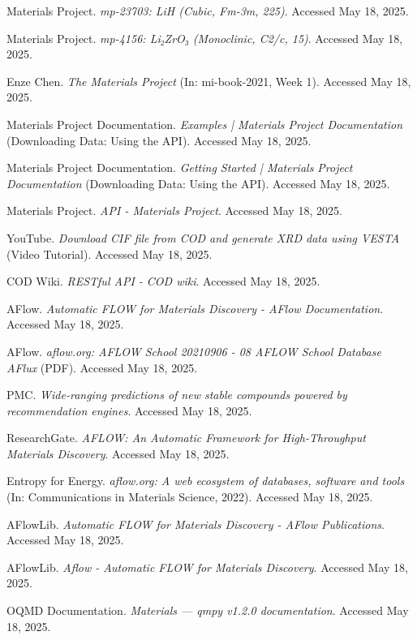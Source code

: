 \documentclass[letterpaper]{article} %
\begin{document}
\begin{thebibliography}{99}
 Materials Project. \textit{mp-23703: LiH (Cubic, Fm-3m, 225)}. Accessed May 18, 2025.

 Materials Project. \textit{mp-4156: Li₂ZrO₃ (Monoclinic, C2/c, 15)}. Accessed May 18, 2025.

 Enze Chen. \textit{The Materials Project} (In: mi-book-2021, Week 1). Accessed May 18, 2025.

 Materials Project Documentation. \textit{Examples | Materials Project Documentation} (Downloading Data: Using the API). Accessed May 18, 2025.

 Materials Project Documentation. \textit{Getting Started | Materials Project Documentation} (Downloading Data: Using the API). Accessed May 18, 2025.

 Materials Project. \textit{API - Materials Project}. Accessed May 18, 2025.

 YouTube. \textit{Download CIF file from COD and generate XRD data using VESTA} (Video Tutorial). Accessed May 18, 2025.

 COD Wiki. \textit{RESTful API - COD wiki}. Accessed May 18, 2025.

 AFlow. \textit{Automatic FLOW for Materials Discovery - AFlow Documentation}. Accessed May 18, 2025.

 AFlow. \textit{aflow.org: AFLOW School 20210906 - 08 AFLOW School Database AFlux} (PDF). Accessed May 18, 2025.

 PMC. \textit{Wide-ranging predictions of new stable compounds powered by recommendation engines}. Accessed May 18, 2025.

 ResearchGate. \textit{AFLOW: An Automatic Framework for High-Throughput Materials Discovery}. Accessed May 18, 2025.

 Entropy for Energy. \textit{aflow.org: A web ecosystem of databases, software and tools} (In: Communications in Materials Science, 2022). Accessed May 18, 2025.

 AFlowLib. \textit{Automatic FLOW for Materials Discovery - AFlow Publications}. Accessed May 18, 2025.

 AFlowLib. \textit{Aflow - Automatic FLOW for Materials Discovery}. Accessed May 18, 2025.

 OQMD Documentation. \textit{Materials — qmpy v1.2.0 documentation}. Accessed May 18, 2025.


\end{thebibliography}
\end{document}
